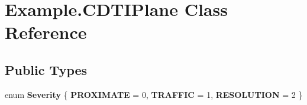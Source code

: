 \hypertarget{class_example_1_1_c_d_t_i_plane}{}\section{Example.\+C\+D\+T\+I\+Plane Class Reference}
\label{class_example_1_1_c_d_t_i_plane}


 


\subsection*{Public Types}
\begin{DoxyCompactItemize}
\item 
enum {\bfseries Severity} \{ {\bfseries P\+R\+O\+X\+I\+M\+A\+TE} = 0, 
{\bfseries T\+R\+A\+F\+F\+IC} = 1, 
{\bfseries R\+E\+S\+O\+L\+U\+T\+I\+ON} = 2
 \}\hypertarget{class_example_1_1_c_d_t_i_plane_af140920ed953b8579db5c8021fa03f92}{}\label{class_example_1_1_c_d_t_i_plane_af140920ed953b8579db5c8021fa03f92}

\end{DoxyCompactItemize}
